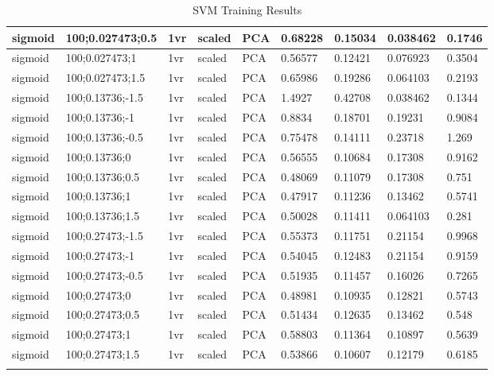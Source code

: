 \begin{longtable}{lllllllll}
sigmoid & 100;0.027473;0.5 & 1vr & scaled & PCA & 0.68228 & 0.15034 & 0.038462 & 0.1746\\ \hline
sigmoid & 100;0.027473;1 & 1vr & scaled & PCA & 0.56577 & 0.12421 & 0.076923 & 0.3504\\ \hline
sigmoid & 100;0.027473;1.5 & 1vr & scaled & PCA & 0.65986 & 0.19286 & 0.064103 & 0.2193\\ \hline
sigmoid & 100;0.13736;-1.5 & 1vr & scaled & PCA & 1.4927 & 0.42708 & 0.038462 & 0.1344\\ \hline
sigmoid & 100;0.13736;-1 & 1vr & scaled & PCA & 0.8834 & 0.18701 & 0.19231 & 0.9084\\ \hline
sigmoid & 100;0.13736;-0.5 & 1vr & scaled & PCA & 0.75478 & 0.14111 & 0.23718 & 1.269\\ \hline
sigmoid & 100;0.13736;0 & 1vr & scaled & PCA & 0.56555 & 0.10684 & 0.17308 & 0.9162\\ \hline
sigmoid & 100;0.13736;0.5 & 1vr & scaled & PCA & 0.48069 & 0.11079 & 0.17308 & 0.751\\ \hline
sigmoid & 100;0.13736;1 & 1vr & scaled & PCA & 0.47917 & 0.11236 & 0.13462 & 0.5741\\ \hline
sigmoid & 100;0.13736;1.5 & 1vr & scaled & PCA & 0.50028 & 0.11411 & 0.064103 & 0.281\\ \hline
sigmoid & 100;0.27473;-1.5 & 1vr & scaled & PCA & 0.55373 & 0.11751 & 0.21154 & 0.9968\\ \hline
sigmoid & 100;0.27473;-1 & 1vr & scaled & PCA & 0.54045 & 0.12483 & 0.21154 & 0.9159\\ \hline
sigmoid & 100;0.27473;-0.5 & 1vr & scaled & PCA & 0.51935 & 0.11457 & 0.16026 & 0.7265\\ \hline
sigmoid & 100;0.27473;0 & 1vr & scaled & PCA & 0.48981 & 0.10935 & 0.12821 & 0.5743\\ \hline
sigmoid & 100;0.27473;0.5 & 1vr & scaled & PCA & 0.51434 & 0.12635 & 0.13462 & 0.548\\ \hline
sigmoid & 100;0.27473;1 & 1vr & scaled & PCA & 0.58803 & 0.11364 & 0.10897 & 0.5639\\ \hline
sigmoid & 100;0.27473;1.5 & 1vr & scaled & PCA & 0.53866 & 0.10607 & 0.12179 & 0.6185\\ \hline


\caption{SVM Training Results}
\label{tbl:svm_train}
\end{longtable}